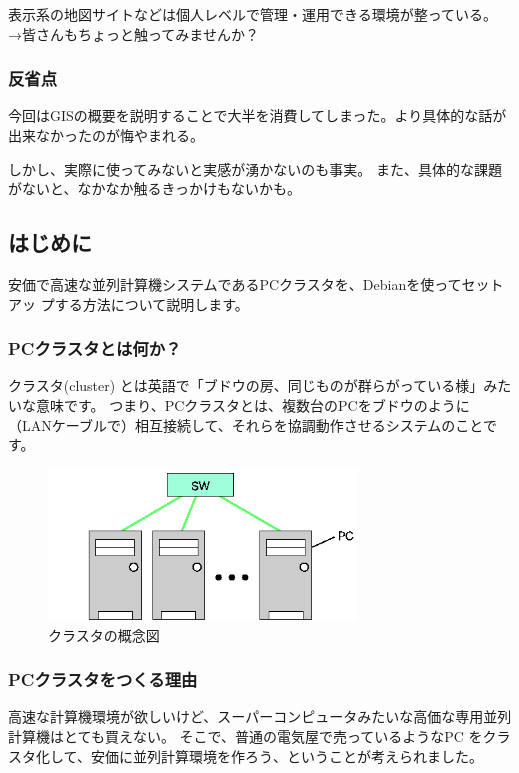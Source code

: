 \documentclass[mingoth,a4paper]{jsarticle}
\begin{document}
表示系の地図サイトなどは個人レベルで管理・運用できる環境が整っている。\\
→皆さんもちょっと触ってみませんか？

\subsubsection{反省点}
今回はGISの概要を説明することで大半を消費してしまった。より具体的な話が
出来なかったのが悔やまれる。

しかし、実際に使ってみないと実感が湧かないのも事実。
また、具体的な課題がないと、なかなか触るきっかけもないかも。


\subsection{はじめに}
安価で高速な並列計算機システムであるPCクラスタを、Debianを使ってセットアッ
プする方法について説明します。

\subsubsection{PCクラスタとは何か？}
クラスタ(cluster) とは英語で「ブドウの房、同じものが群らがっている様」みたいな意味です。
つまり、PCクラスタとは、複数台のPCをブドウのように（LANケーブルで）相互接続して、それらを協調動作させるシステムのことです。

\begin{figure}[!htbp]
 \begin{center}
 \includegraphics[width=82mm]{image200802/cluster.png}
  \caption{クラスタの概念図}
  \label{fig:ga-map}
 \end{center}
\end{figure}
\vspace{-3mm}

\subsubsection{PCクラスタをつくる理由}
高速な計算機環境が欲しいけど、スーパーコンピュータみたいな高価な専用並列計算機はとても買えない。
そこで、普通の電気屋で売っているようなPC をクラスタ化して、安価に並列計算環境を作ろう、ということが考えられました。
\end{document}
